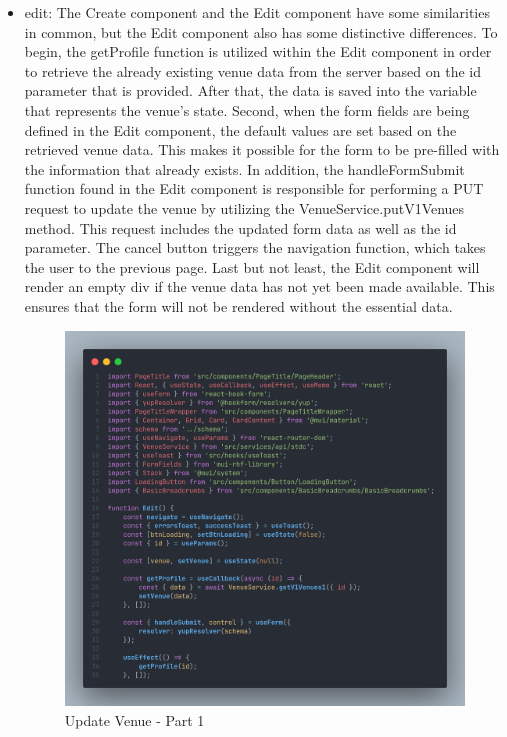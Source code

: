 \begin{justify}
\begin{itemize}
            \item edit: The Create component and the Edit component have some similarities in common, but the Edit component also has some distinctive differences. To begin, the getProfile function is utilized within the Edit component in order to retrieve the already existing venue data from the server based on the id parameter that is provided. After that, the data is saved into the variable that represents the venue's state. Second, when the form fields are being defined in the Edit component, the default values are set based on the retrieved venue data. This makes it possible for the form to be pre-filled with the information that already exists. In addition, the handleFormSubmit function found in the Edit component is responsible for performing a PUT request to update the venue by utilizing the VenueService.putV1Venues method. This request includes the updated form data as well as the id parameter. The cancel button triggers the navigation function, which takes the user to the previous page. Last but not least, the Edit component will render an empty div if the venue data has not yet been made available. This ensures that the form will not be rendered without the essential data.

                \begin{figure}[H]
                    \centerline{\includegraphics[width=150mm,scale=1]{figures/implementation_and_testing/implementation/frontend/update_venue-1.png}}
                    \caption{Update Venue - Part 1}
                \end{figure}
    

\end{itemize}
\end{justify}
